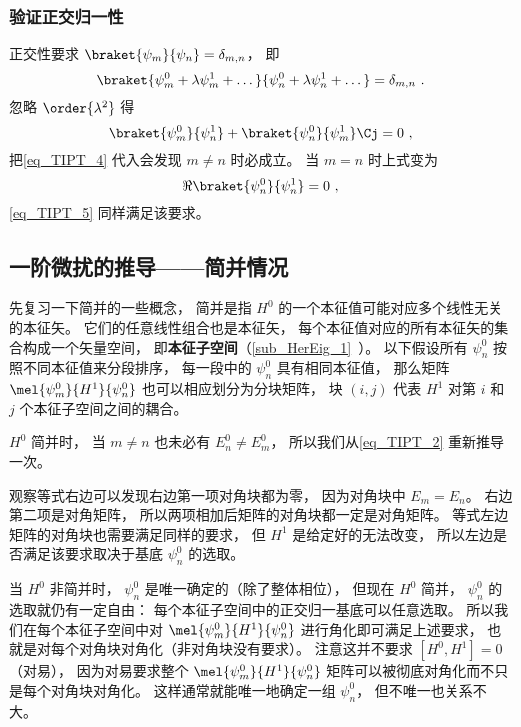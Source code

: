 \subsubsection{验证正交归一性}
正交性要求 $\braket{\psi_m}{\psi_n} = \delta_{m,n}$， 即
\begin{equation}\label{eq_TIPT_7}
\braket{\psi_m^0 + \lambda \psi_m^1 + \dots}{\psi_n^0 + \lambda \psi_n^1 + \dots} = \delta_{m,n}~.
\end{equation}
忽略 $\order{\lambda^2}$ 得
\begin{equation}\label{eq_TIPT_8}
\braket{\psi_m^0}{\psi_n^1} + \braket{\psi_n^0}{\psi_m^1}\Cj = 0~,
\end{equation}
把\autoref{eq_TIPT_4} 代入会发现 $m \ne n$ 时必成立。 当 $m = n$ 时上式变为
\begin{equation}
\Re{\braket{\psi_n^0}{\psi_n^1}} = 0~,
\end{equation}
\autoref{eq_TIPT_5} 同样满足该要求。

\subsection{一阶微扰的推导——简并情况}
先复习一下简并的一些概念， 简并是指 $H^0$ 的一个本征值可能对应多个线性无关的本征矢。 它们的任意线性组合也是本征矢， 每个本征值对应的所有本征矢的集合构成一个矢量空间， 即\textbf{本征子空间}（\autoref{sub_HerEig_1}~）。 以下假设所有 $\psi_n^0$ 按照不同本征值来分段排序， 每一段中的 $\psi_n^0$ 具有相同本征值， 那么矩阵 $\mel{\psi_m^0}{H^1}{\psi_n^0}$ 也可以相应划分为分块矩阵， 块 $(i,j)$ 代表 $H^1$ 对第 $i$ 和 $j$ 个本征子空间之间的耦合。

$H^0$ 简并时， 当 $m\ne n$ 也未必有 $E_n^0 \ne E_m^0$， 所以我们从\autoref{eq_TIPT_2} 重新推导一次。

观察等式右边可以发现右边第一项对角块都为零， 因为对角块中 $E_m = E_n$。 右边第二项是对角矩阵， 所以两项相加后矩阵的对角块都一定是对角矩阵。 等式左边矩阵的对角块也需要满足同样的要求， 但 $H^1$ 是给定好的无法改变， 所以左边是否满足该要求取决于基底 $\psi_n^0$ 的选取。

当 $H^0$ 非简并时， $\psi_n^0$ 是唯一确定的（除了整体相位）， 但现在 $H^0$ 简并， $\psi_n^0$ 的选取就仍有一定自由： 每个本征子空间中的正交归一基底可以任意选取。 所以我们在每个本征子空间中对 $\mel{\psi_m^0}{H^1}{\psi_n^0}$ 进行角化即可满足上述要求， 也就是对每个对角块对角化（非对角块没有要求）。 注意这并不要求 $[H^0, H^1] = 0$ （对易）， 因为对易要求整个 $\mel{\psi_m^0}{H^1}{\psi_n^0}$ 矩阵可以被彻底对角化而不只是每个对角块对角化。 这样通常就能唯一地确定一组 $\psi_n^0$， 但不唯一也关系不大。

